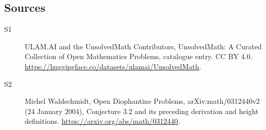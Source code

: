 \documentclass[11pt]{article}
\begin{document}
\subsection{Sources}
\begin{description}
\item[\hypertarget{source:statement:1}{S1}] ULAM.AI and the UnsolvedMath Contributors, UnsolvedMath: A Curated Collection of Open Mathematics Problems, catalogue entry. CC BY 4.0. \url{https://huggingface.co/datasets/ulamai/UnsolvedMath}.
\item[\hypertarget{source:statement:2}{S2}] Michel Waldschmidt, Open Diophantine Problems, arXiv:math/0312440v2 (24 January 2004), Conjecture 3.2 and its preceding derivation and height definitions. \url{https://arxiv.org/abs/math/0312440}.
\end{description}
\label{end:statement}
\end{document}
